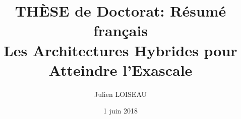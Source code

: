 \documentclass[12pt,a4paper]{report}
\title{TH\`ESE de Doctorat: Résumé français\\Les Architectures Hybrides pour Atteindre l'Exascale}
\author{Julien LOISEAU}
\date{1 juin 2018}
\begin{document}
\newcommand{\phdAuthor}{Julien LOISEAU}
\newcommand{\defenseDate}{le 18 Mars 2018}
\newcommand{\phdDiscipline}{Informatique}
\newcommand{\phdSpeciality}{Calcul Haute Performance}
\newcommand{\phdTitleEN}{Hybrids Architectures to Reach Exascale}
\newcommand{\phdTitleFR}{Le choix des architectures hybrides, une stratégie réaliste pour atteindre l'échelle exaflopique}
\newcommand{\phdDirector}{Michaël KRAJECKI, Professeur des Universités}


\thispagestyle{empty}
\end{document}
